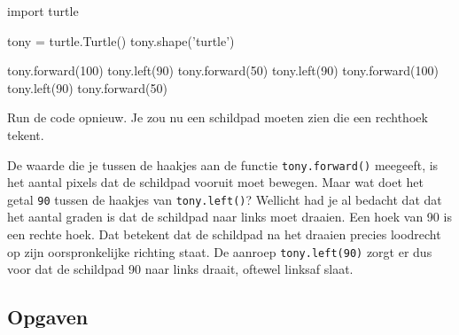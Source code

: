 \documentclass[../main]{subfiles}
\begin{document}
\begin{python}[style=mu, caption={\file{hello\_turtle.py}}, label={lst:hello-turtle-02}]
import turtle

tony = turtle.Turtle()
tony.shape('turtle')

tony.forward(100)
tony.left(90)
tony.forward(50)
tony.left(90)
tony.forward(100)
tony.left(90)
tony.forward(50)
\end{python}

Run de code opnieuw. Je zou nu een schildpad moeten zien die een rechthoek tekent.

\begin{infobox}[Draaiingshoeken]
De waarde die je tussen de haakjes aan de functie \texttt{tony.forward()} meegeeft, is het aantal pixels dat de schildpad vooruit moet bewegen. Maar wat doet het getal \texttt{90} tussen de haakjes van \texttt{tony.left()}? Wellicht had je al bedacht dat dat het aantal graden is dat de schildpad naar links moet draaien. Een hoek van 90\textdegree{} is een rechte hoek. Dat betekent dat de schildpad na het draaien precies loodrecht op zijn oorspronkelijke richting staat. De aanroep \texttt{tony.left(90)} zorgt er dus voor dat de schildpad 90\textdegree{} naar links draait, oftewel linksaf slaat.

\begin{center}
\end{center}
\end{infobox}
\subsection*{Opgaven}
\end{document}
